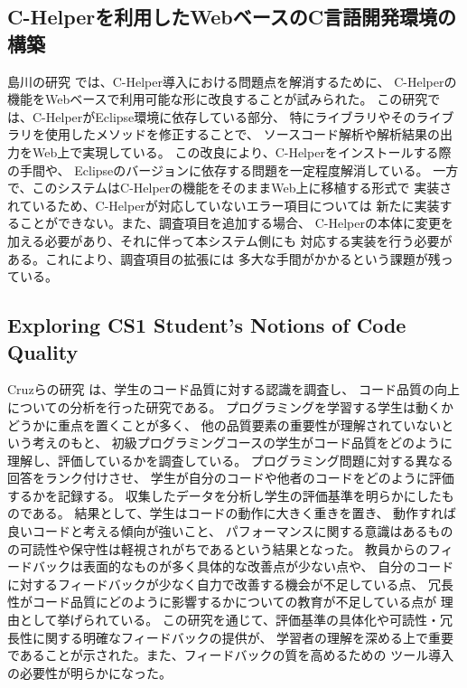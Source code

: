 \documentclass{cssspaper}
\begin{document}
            \subsection{C-Helperを利用したWebベースのC言語開発環境の構築}
            島川の研究 \cite{4}では、C-Helper導入における問題点を解消するために、
            C-Helperの機能をWebベースで利用可能な形に改良することが試みられた。
            この研究では、C-HelperがEclipse環境に依存している部分、
            特にライブラリやそのライブラリを使用したメソッドを修正することで、
            ソースコード解析や解析結果の出力をWeb上で実現している。
            この改良により、C-Helperをインストールする際の手間や、
            Eclipseのバージョンに依存する問題を一定程度解消している。
            一方で、このシステムはC-Helperの機能をそのままWeb上に移植する形式で
            実装されているため、C-Helperが対応していないエラー項目については
            新たに実装することができない。また、調査項目を追加する場合、
            C-Helperの本体に変更を加える必要があり、それに伴って本システム側にも
            対応する実装を行う必要がある。これにより、調査項目の拡張には
            多大な手間がかかるという課題が残っている。

            \subsection{Exploring CS1 Student's Notions of Code Quality}
            Cruzらの研究 \cite{5}は、学生のコード品質に対する認識を調査し、
            コード品質の向上についての分析を行った研究である。
            プログラミングを学習する学生は動くかどうかに重点を置くことが多く、
            他の品質要素の重要性が理解されていないという考えのもと、
            初級プログラミングコースの学生がコード品質をどのように理解し、評価しているかを調査している。
            プログラミング問題に対する異なる回答をランク付けさせ、
            学生が自分のコードや他者のコードをどのように評価するかを記録する。
            収集したデータを分析し学生の評価基準を明らかにしたものである。
            結果として、学生はコードの動作に大きく重きを置き、
            動作すれば良いコードと考える傾向が強いこと、
            パフォーマンスに関する意識はあるものの可読性や保守性は軽視されがちであるという結果となった。
            教員からのフィードバックは表面的なものが多く具体的な改善点が少ない点や、
            自分のコードに対するフィードバックが少なく自力で改善する機会が不足している点、
            冗長性がコード品質にどのように影響するかについての教育が不足している点が
            理由として挙げられている。
            この研究を通じて、評価基準の具体化や可読性・冗長性に関する明確なフィードバックの提供が、
            学習者の理解を深める上で重要であることが示された。また、フィードバックの質を高めるための
            ツール導入の必要性が明らかになった。
\end{document}

